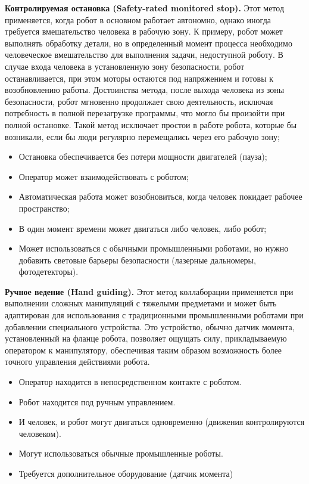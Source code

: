 \textbf{Контролируемая остановка (Safety-rated monitored stop).} Этот метод применяется, когда робот в основном работает автономно, однако иногда требуется вмешательство человека в рабочую зону. К примеру, робот может выполнять обработку детали, но в определенный момент процесса необходимо человеческое вмешательство для выполнения задачи, недоступной роботу. В случае входа человека в установленную зону безопасности, робот останавливается, при этом моторы остаются под напряжением и готовы к возобновлению работы. Достоинства метода, после выхода человека из зоны безопасности, робот мгновенно продолжает свою деятельность, исключая потребность в полной перезагрузке программы, что могло бы произойти при полной остановке. Такой метод исключает простои в работе робота, которые бы возникали, если бы люди регулярно перемещались через его рабочую зону;
\begin{itemize}
	\item Остановка обеспечивается без потери мощности двигателей (пауза);
	\item Оператор может взаимодействовать с роботом;
	\item Автоматическая работа может возобновиться, когда человек покидает рабочее пространство;
	\item В один момент времени может двигаться либо человек, либо робот;
	\item Может использоваться с обычными промышленными роботами, но нужно добавить световые барьеры безопасности (лазерные дальномеры, фотодетекторы).
\end{itemize}

\textbf{Ручное ведение (Hand guiding).}
Этот метод коллаборации применяется при выполнении сложных манипуляций с тяжелыми предметами и может быть адаптирован для использования с традиционными промышленными роботами при добавлении специального устройства. Это устройство, обычно датчик момента, установленный на фланце робота, позволяет ощущать силу, прикладываемую оператором к манипулятору, обеспечивая таким образом возможность более точного управления действиями робота.

\begin{itemize}
	\item Оператор находится в непосредственном контакте с роботом.
	\item Робот находится под ручным управлением.
	\item И человек, и робот могут двигаться одновременно (движения контролируются человеком).
	\item Могут использоваться обычные промышленные роботы.
	\item Требуется дополнительное оборудование (датчик момента)
\end{itemize}

